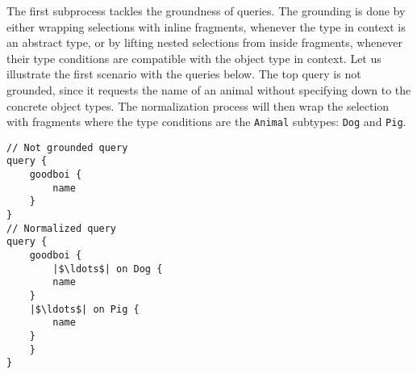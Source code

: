 \iffalse
\begin{itemize}
    \item Grounding: Selections are either wrapped with inline fragments or lifted from an inline fragment.

    \item Merging: Fields with the same response name have their subqueries merged into a single selection.
    
    
\end{itemize}
\fi

The first subprocess tackles the groundness of queries. The grounding is done by either wrapping selections with inline fragments, whenever the type in context is an abstract type, or by lifting nested selections from inside fragments, whenever their type conditions are compatible with the object type in context. Let us illustrate the first scenario with the queries below. The top query is not grounded, since it requests the name of an animal without specifying down to the concrete object types. The normalization process will then wrap the selection with fragments where the type conditions are the \texttt{Animal} subtypes: \texttt{Dog} and \texttt{Pig}.

\begin{verbatim}
// Not grounded query
query {
    goodboi {
        name
    }
}
// Normalized query
query {
    goodboi {
        |$\ldots$| on Dog {
	    name
	}
	|$\ldots$| on Pig {
	    name
	}
    }	
}
\end{verbatim} 

